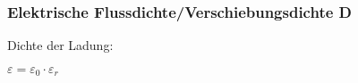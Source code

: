 \subsubsection{Elektrische Flussdichte/Verschiebungsdichte D}
    \begin{minipage}{0.49\linewidth}
        \begin{center}
            Dichte der Ladung:\\
        \end{center}
    \end{minipage}
    \begin{minipage}{0.49\linewidth}
        \begin{center}
                $\varepsilon = \varepsilon_0 \cdot \varepsilon_r$
        \end{center}
    \end{minipage}
    \vspace{0em}